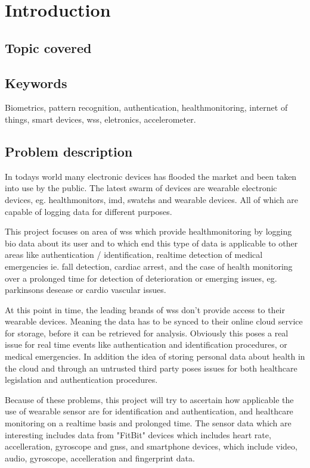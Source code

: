 \chapter{Introduction}\label{sec:intro}

\section{Topic covered}\label{sec:}


\section{Keywords}\label{sec:}
Biometrics, pattern recognition, authentication, healthmonitoring, internet of
things, smart devices, \glspl{ws}, eletronics, accelerometer.

\section{Problem description}\label{sec:}
In todays world many electronic devices has flooded the market and been taken
into use by the public.  The latest swarm of devices are wearable electronic
devices, eg. healthmonitors, \gls{imd}, \glspl{swatch} and wearable devices.
All of which are capable of logging data for different purposes.

This project focuses on area of \glspl{ws} which provide healthmonitoring
by logging \gls{bio} data about its user and to which end this type of data is
applicable to other areas like authentication / identification, realtime
detection of medical emergencies ie. fall detection, cardiac arrest, and the
case of health monitoring over a prolonged time for detection of deterioration
or emerging issues, eg. parkinsons desease or cardio vascular issues.

At this point in time, the leading brands of \glspl{ws} don't provide
access to their wearable devices. Meaning the data has to be synced to their
online \gls{cloud} service for storage, before it can be retrieved for analysis.
Obviously this poses a real issue for real time events like authentication and
identification procedures, or medical emergencies. In addition the idea of
storing personal data about health in the \gls{cloud} and through an untrusted third
party poses issues for both healthcare legislation and authentication
procedures.

Because of these problems, this project will try to ascertain how applicable the
use of wearable sensor are for identification and authentication, and healthcare
monitoring on a realtime basis and prolonged time.  The sensor data which are
interesting includes data from "FitBit" devices which includes heart rate, 
accelleration, gyroscope and \Gls{gnss}, and smartphone devices, which include 
video, audio, gyroscope, accelleration and fingerprint data.

